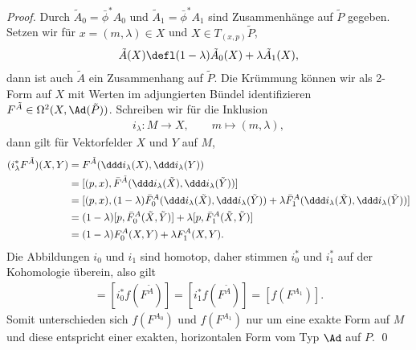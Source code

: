 \documentclass[%
	paper=a5,%
	fleqn,%
	DIV=18,%
	BCOR=0mm,
	fontsize=11pt,
	titlepage=false,%
	bibliography=totoc,
	DIV=18,%
	twoside=true,
	pdftitle=Riemannsche Geometrie,
	pdfauthor=Uwe Semmelmann,
	numbers=noendperiod]%
	{scrbook}
\begin{document}
\begin{proof}
{}

\noindent
Durch $\tilde{A}_0 = \bar{\phi}^*A_0$ und  $\tilde{A}_1 = \bar{\phi}^*A_1$ sind
Zusammenhänge auf $\tilde{P}$ gegeben.
Setzen wir für $x=(m,\lambda)\in X$ und $X\in T_{(x,p)}\tilde{P}$,
\begin{align*}
\tilde{A}(X) \defl (1-\lambda)\tilde{A}_0(X) + \lambda\tilde{A}_1(X),
\end{align*}
dann ist auch $\tilde{A}$ ein Zusammenhang auf $\tilde{P}$. Die Krümmung
 können wir als 2-Form auf $X$ mit Werten im adjungierten Bündel
identifizieren $F^{\tilde{A}}\in\Omega^2(X,\Ad(\tilde{P}))$. Schreiben wir für
die Inklusion
\begin{align*}
i_\lambda: M\to X,\qquad m\mapsto (m,\lambda),
\end{align*}
dann gilt für Vektorfelder $X$ und $Y$ auf $M$,
\begin{align*}
(i_\lambda^* F^{\tilde{A}})(X,Y) &= 
F^{\tilde{A}}(\ddd i_\lambda(X),\ddd i_\lambda(Y))\\
&= 
[(p,x),\bar{F}^{\tilde{A}}(\ddd i_\lambda(\tilde{X}),\ddd
i_\lambda(\tilde{Y}))]\\
&= 
[(p,x),(1-\lambda)\bar{F}^A_0(\ddd i_\lambda(\tilde{X}),\ddd
i_\lambda(\tilde{Y})) + 
\lambda \bar{F}^A_1(\ddd i_\lambda(\tilde{X}),\ddd i_\lambda(\tilde{Y}))
]\\
&=
(1-\lambda)[p,\bar{F}^A_0(\tilde{X},\tilde{Y})] +
\lambda[p,\bar{F}^A_1(\tilde{X},\tilde{Y})]\\
&=
(1-\lambda)F^A_0(X,Y) + \lambda F^{A}_1(X,Y).
\end{align*}
Die Abbildungen $i_0$ und $i_1$ sind homotop, daher stimmen $i_0^*$ und $i_1^*$
auf der Kohomologie überein, also gilt
\begin{align*}
[f(F^{A_0})] = [i_0^*f(F^{\tilde{A}})] = [i_1^*f(F^{\tilde{A}})] = 
[f(F^{A_1})].
\end{align*}
Somit unterschieden sich $f(F^{A_0})$ und $f(F^{A_1})$ nur um eine exakte Form
auf $M$ und diese entspricht einer exakten, horizontalen Form vom Typ
$\Ad$ auf $P$.
%
%
%
%
\qed
\end{proof}
\end{document}
